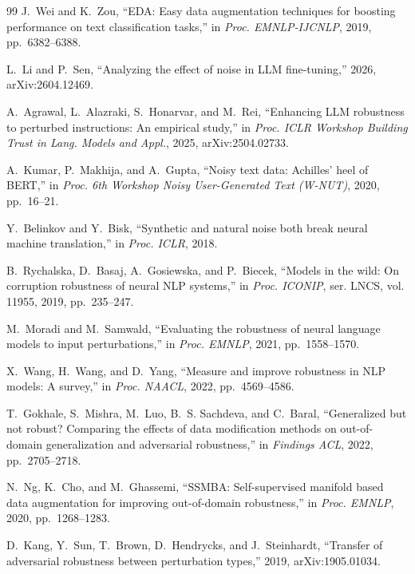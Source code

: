 \documentclass[conference]{IEEEtran}
\begin{document}
\begin{thebibliography}{99}
J.~Wei and K.~Zou, ``{EDA}: Easy data augmentation techniques for boosting performance on text classification tasks,'' in \emph{Proc. EMNLP-IJCNLP}, 2019, pp.~6382--6388.

L.~Li and P.~Sen, ``Analyzing the effect of noise in {LLM} fine-tuning,'' 2026, arXiv:2604.12469.

A.~Agrawal, L.~Alazraki, S.~Honarvar, and M.~Rei, ``Enhancing {LLM} robustness to perturbed instructions: An empirical study,'' in \emph{Proc. ICLR Workshop Building Trust in Lang. Models and Appl.}, 2025, arXiv:2504.02733.

A.~Kumar, P.~Makhija, and A.~Gupta, ``Noisy text data: {Achilles'} heel of {BERT},'' in \emph{Proc. 6th Workshop Noisy User-Generated Text (W-NUT)}, 2020, pp.~16--21.

Y.~Belinkov and Y.~Bisk, ``Synthetic and natural noise both break neural machine translation,'' in \emph{Proc. ICLR}, 2018.

B.~Rychalska, D.~Basaj, A.~Gosiewska, and P.~Biecek, ``Models in the wild: On corruption robustness of neural {NLP} systems,'' in \emph{Proc. ICONIP}, ser. LNCS, vol. 11955, 2019, pp.~235--247.

M.~Moradi and M.~Samwald, ``Evaluating the robustness of neural language models to input perturbations,'' in \emph{Proc. EMNLP}, 2021, pp.~1558--1570.

X.~Wang, H.~Wang, and D.~Yang, ``Measure and improve robustness in {NLP} models: A survey,'' in \emph{Proc. NAACL}, 2022, pp.~4569--4586.

T.~Gokhale, S.~Mishra, M.~Luo, B.~S. Sachdeva, and C.~Baral, ``Generalized but not robust? {C}omparing the effects of data modification methods on out-of-domain generalization and adversarial robustness,'' in \emph{Findings ACL}, 2022, pp.~2705--2718.

N.~Ng, K.~Cho, and M.~Ghassemi, ``{SSMBA}: Self-supervised manifold based data augmentation for improving out-of-domain robustness,'' in \emph{Proc. EMNLP}, 2020, pp.~1268--1283.

D.~Kang, Y.~Sun, T.~Brown, D.~Hendrycks, and J.~Steinhardt, ``Transfer of adversarial robustness between perturbation types,'' 2019, arXiv:1905.01034.


\end{thebibliography}
\end{document}
